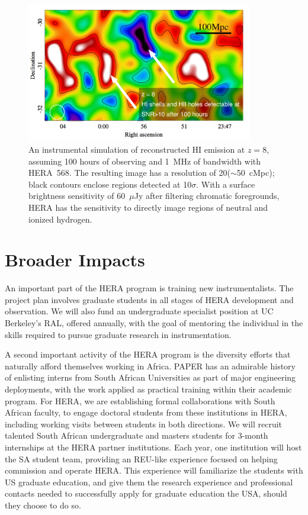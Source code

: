 \documentclass[preprint]{aastex}
\def\HI{{H{\small I }}}
\begin{document}
\begin{figure}[t] \centering
\includegraphics[height=2.4in]{plots/HERA_z8_SNR_wide_annotated.jpg}
\caption{\small 
An instrumental simulation of reconstructed \HI emission at $z=8$,
assuming 100 hours of observing and 1~MHz of bandwidth with HERA~568.  The resulting
image has a resolution of 20\arcmin ($\sim$50~cMpc); black contours
enclose regions detected at 10$\sigma$.
With a surface brightness sensitivity of 60~$\mu$Jy after filtering chromatic
foregrounds, HERA has the sensitivity
to directly image regions of neutral and ionized hydrogen.
\label{imaging}}
\end{figure}

\vspace{-0.25in}
\section{Broader Impacts}
\label{BIsec}

An important part of the HERA program is training new
instrumentalists.  The project plan involves graduate students in all
stages of HERA development and observation. We will also fund an
undergraduate specialist position
at UC Berkeley's RAL, offered annually, with the goal of
mentoring the individual in the skills required to pursue graduate
research in instrumentation.

A second important activity of the HERA program is the diversity
efforts that naturally afford themselves working in Africa. PAPER has
an admirable history of enlisting interns from South African
Universities as part of major engineering deployments, with the work
applied as practical training within their academic program.
For HERA, we are establishing formal collaborations with South African
faculty, to engage doctoral students from these institutions in HERA,
including working visits between students in both directions. We will
recruit talented South African undergraduate and masters students for
3-month internships at the HERA partner institutions. Each year, one
institution will host the SA student team, providing an REU-like
experience focused on helping commission and operate HERA. This
experience will familiarize the students with US graduate education,
and give them the research experience and professional contacts needed
to successfully apply for graduate education the USA, should they
choose to do so.
\end{document}

